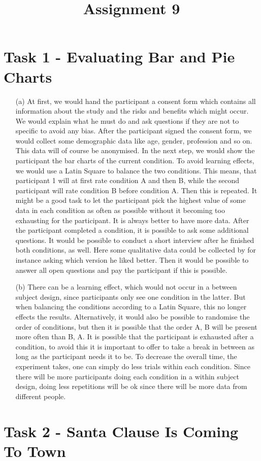 \documentclass[a4paper]{article}
\date{}
\author{}
\title{\textbf{Assignment 9}}
\begin{document}
\maketitle 
\thispagestyle{fancy}


\section*{Task 1 - Evaluating Bar and Pie Charts}

\begin{enumerate}
	\item[(a)]  
	At first, we would hand the participant a consent form which contains all information about the study and the risks and benefits which might occur. 
	We would explain what he must do and ask questions if they are not to specific to avoid any bias. 
	After the participant signed the consent form, we would collect some demographic data like age, gender, profession and so on. 
	This data will of course be anonymised. 
	In the next step, we would show the participant the bar charts of the current condition. 
	To avoid learning effects, we would use a Latin Square to balance the two conditions. 
	This means, that participant 1 will at first rate condition A and then B, while the second participant will rate condition B before condition A. 
	Then this is repeated.
	It might be a good task to let the participant pick the highest value of some data in each condition as often as possible without it becoming too exhausting for the participant. 
	It is always better to have more data. 
	After the participant completed a condition, it is possible to ask some additional questions. 
	It would be possible to conduct a short interview after he finished both conditions, as well. 
	Here some qualitative data could be collected by for instance asking which version he liked better. 
	Then it would be possible to answer all open questions and pay the participant if this is possible.  
	\item[(b)] There can be a learning effect, which would not occur in a between subject design, since participants only see one condition in the latter. 
	But when balancing the conditions according to a Latin Square, this no longer effects the results. 
	Alternatively, it would also be possible to randomise the order of conditions, but then it is possible that the order A, B will be present more often than B, A. 
	It is possible that the participant is exhausted after a condition, to avoid this it is important to offer to take a break in between as long as the participant needs it to be. 
	To decrease the overall time, the experiment takes, one can simply do less trials within each condition. 
	Since there will be more participants doing each condition in a within subject design, doing less repetitions will be ok since there will be more data from different people. 
\end{enumerate}


\section*{Task 2 - Santa Clause Is Coming To Town}
\end{document}
